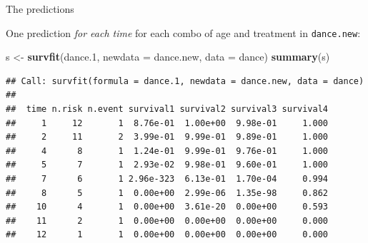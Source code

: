 \documentclass[ignorenonframetext,]{beamer}
\newenvironment{Shaded}{\begin{snugshade}}{\end{snugshade}}
\newcommand{\DataTypeTok}[1]{\textcolor[rgb]{0.13,0.29,0.53}{#1}}
\newcommand{\FloatTok}[1]{\textcolor[rgb]{0.00,0.00,0.81}{#1}}
\newcommand{\KeywordTok}[1]{\textcolor[rgb]{0.13,0.29,0.53}{\textbf{#1}}}
\newcommand{\NormalTok}[1]{#1}
\newcommand{\StringTok}[1]{\textcolor[rgb]{0.31,0.60,0.02}{#1}}
\begin{document}
\begin{frame}[fragile]{The predictions}
\protect\hypertarget{the-predictions-1}{}

One prediction \emph{for each time} for each combo of age and treatment
in \texttt{dance.new}:

\footnotesize

\begin{Shaded}
\begin{Highlighting}[]
\NormalTok{s <-}\StringTok{ }\KeywordTok{survfit}\NormalTok{(dance}\FloatTok{.1}\NormalTok{, }\DataTypeTok{newdata =}\NormalTok{ dance.new, }\DataTypeTok{data =}\NormalTok{ dance)}
\KeywordTok{summary}\NormalTok{(s)}
\end{Highlighting}
\end{Shaded}

\begin{verbatim}
## Call: survfit(formula = dance.1, newdata = dance.new, data = dance)
## 
##  time n.risk n.event survival1 survival2 survival3 survival4
##     1     12       1  8.76e-01  1.00e+00  9.98e-01     1.000
##     2     11       2  3.99e-01  9.99e-01  9.89e-01     1.000
##     4      8       1  1.24e-01  9.99e-01  9.76e-01     1.000
##     5      7       1  2.93e-02  9.98e-01  9.60e-01     1.000
##     7      6       1 2.96e-323  6.13e-01  1.70e-04     0.994
##     8      5       1  0.00e+00  2.99e-06  1.35e-98     0.862
##    10      4       1  0.00e+00  3.61e-20  0.00e+00     0.593
##    11      2       1  0.00e+00  0.00e+00  0.00e+00     0.000
##    12      1       1  0.00e+00  0.00e+00  0.00e+00     0.000
\end{verbatim}

\normalsize

\end{frame}
\end{document}
